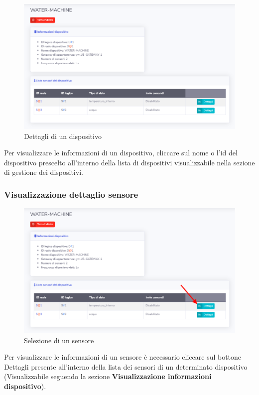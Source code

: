 		\begin{figure}[H]
		\centering
		\includegraphics[scale=0.480]{res/images/admin/dettDisp.png}
		\caption{Dettagli di un dispositivo}
	\end{figure}


		Per visualizzare le informazioni di un dispositivo, cliccare sul nome o l'id del dispositivo prescelto all'interno della lista di dispositivi visualizzabile nella sezione di gestione dei dispositivi.

	\subsubsection{Visualizzazione dettaglio sensore}

		\begin{figure}[H]
		\centering
		\includegraphics[scale=0.480]{res/images/admin/selDettSens.png}
		\caption{Selezione di un sensore}
	\end{figure}


		Per visualizzare le informazioni di un sensore è necessario cliccare sul bottone Dettagli presente all'interno della lista dei sensori di un determinato dispositivo (Visualizzabile seguendo la sezione \textbf{Visualizzazione informazioni dispositivo}).

